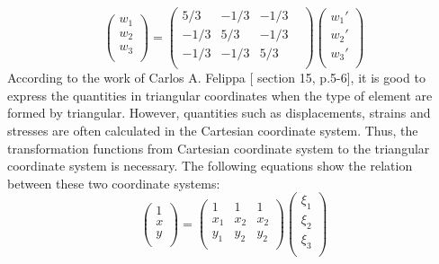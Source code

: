 \begin{equation}
\begin{pmatrix}
w_1 \\
w_2 \\
w_3 \\
\end{pmatrix} = \begin{pmatrix}
5/3 & -1/3 & -1/3 &    \\
-1/3 & 5/3 & -1/3 &    \\
-1/3 & -1/3 & 5/3 &    \\
\end{pmatrix} \begin{pmatrix}
{w_1}' \\
{w_2}' \\
{w_3}' \\
\end{pmatrix}
\end{equation}
According to the work of Carlos A. Felippa [\cite{Felippa} section 15, p.5-6], it is good to express the quantities in triangular coordinates when the type of element are formed by triangular. However, quantities such as displacements, strains and stresses are often calculated in the Cartesian coordinate system. Thus, the transformation functions from Cartesian coordinate system to the triangular coordinate system is necessary. The following equations show the relation between these two coordinate systems:
\begin{equation}
\begin{pmatrix}
1 \\
x \\
y \\
\end{pmatrix}
= 
\begin{pmatrix}
1&1&1 \\
x_1&x_2&x_2 \\
y_1&y_2&y_2 \\
\end{pmatrix}
\begin{pmatrix}
\xi_1 \\
\xi_2 \\
\xi_3 \\
\end{pmatrix}
\end{equation}

